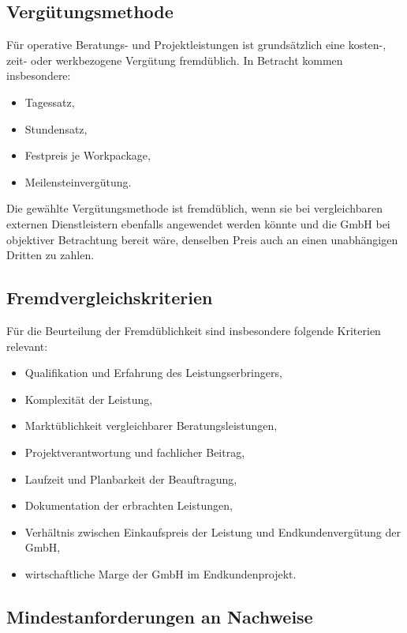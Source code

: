 \documentclass[11pt,a4paper]{article}
\begin{document}
\subsection{Vergütungsmethode}

Für operative Beratungs- und Projektleistungen ist grundsätzlich eine kosten-, zeit- oder werkbezogene Vergütung fremdüblich. In Betracht kommen insbesondere:

\begin{itemize}
    \item Tagessatz,
    \item Stundensatz,
    \item Festpreis je Workpackage,
    \item Meilensteinvergütung.
\end{itemize}

Die gewählte Vergütungsmethode ist fremdüblich, wenn sie bei vergleichbaren externen Dienstleistern ebenfalls angewendet werden könnte und die GmbH bei objektiver Betrachtung bereit wäre, denselben Preis auch an einen unabhängigen Dritten zu zahlen.

\subsection{Fremdvergleichskriterien}

Für die Beurteilung der Fremdüblichkeit sind insbesondere folgende Kriterien relevant:

\begin{itemize}
    \item Qualifikation und Erfahrung des Leistungserbringers,
    \item Komplexität der Leistung,
    \item Marktüblichkeit vergleichbarer Beratungsleistungen,
    \item Projektverantwortung und fachlicher Beitrag,
    \item Laufzeit und Planbarkeit der Beauftragung,
    \item Dokumentation der erbrachten Leistungen,
    \item Verhältnis zwischen Einkaufspreis der Leistung und Endkundenvergütung der GmbH,
    \item wirtschaftliche Marge der GmbH im Endkundenprojekt.
\end{itemize}

\subsection{Mindestanforderungen an Nachweise}
\end{document}
